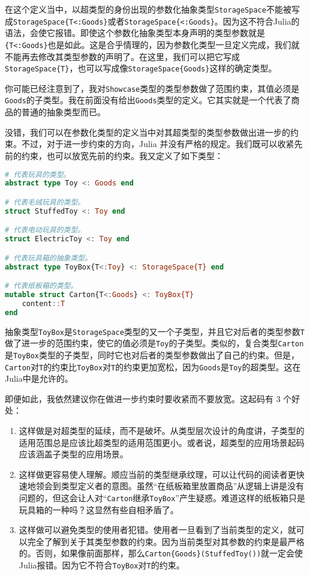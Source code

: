 在这个定义当中，以超类型的身份出现的参数化抽象类型\verb`StorageSpace`不能被写成\verb`StorageSpace{T<:Goods}`或者\verb`StorageSpace{<:Goods}`。因为这不符合Julia的语法，会使它报错。即使这个参数化抽象类型本身声明的类型参数就是\verb`{T<:Goods}`也是如此。这是合乎情理的，因为参数化类型一旦定义完成，我们就不能再去修改其类型参数的声明了。在这里，我们可以把它写成\verb`StorageSpace{T}`，也可以写成像\verb`StorageSpace{Goods}`这样的确定类型。

你可能已经注意到了，我对\verb`Showcase`类型的类型参数做了范围约束，其值必须是\verb`Goods`的子类型。我在前面没有给出\verb`Goods`类型的定义。它其实就是一个代表了商品的普通的抽象类型而已。

没错，我们可以在参数化类型的定义当中对其超类型的类型参数做出进一步的约束。不过，对于进一步约束的方向，Julia 并没有严格的规定。我们既可以收紧先前的约束，也可以放宽先前的约束。我又定义了如下类型：
\begin{lstlisting}[language=julia]
# 代表玩具的类型。
abstract type Toy <: Goods end

# 代表毛绒玩具的类型。
struct StuffedToy <: Toy end

# 代表电动玩具的类型。
struct ElectricToy <: Toy end

# 代表玩具箱的抽象类型。
abstract type ToyBox{T<:Toy} <: StorageSpace{T} end

# 代表纸板箱的类型。
mutable struct Carton{T<:Goods} <: ToyBox{T}
    content::T
end
\end{lstlisting}

抽象类型\verb`ToyBox`是\verb`StorageSpace`类型的又一个子类型，并且它对后者的类型参数\verb`T`做了进一步的范围约束，使它的值必须是\verb`Toy`的子类型。类似的，复合类型\verb`Carton`是\verb`ToyBox`类型的子类型，同时它也对后者的类型参数做出了自己的约束。但是，\verb`Carton`对\verb`T`的约束比\verb`ToyBox`对\verb`T`的约束更加宽松，因为\verb`Goods`是\verb`Toy`的超类型。这在Julia中是允许的。

即便如此，我依然建议你在做进一步约束时要收紧而不要放宽。这起码有 3 个好处：

\begin{enumerate}
\item 这样做是对超类型的延续，而不是破坏。从类型层次设计的角度讲，子类型的适用范围总是应该比超类型的适用范围更小。或者说，超类型的应用场景起码应该涵盖子类型的应用场景。
\item 这样做更容易使人理解。顺应当前的类型继承纹理，可以让代码的阅读者更快速地领会到类型定义者的意图。虽然“在纸板箱里放置商品”从逻辑上讲是没有问题的，但这会让人对“\verb`Carton`继承\verb`ToyBox`”产生疑惑。难道这样的纸板箱只是玩具箱的一种吗？这显然有些自相矛盾了。
\item 这样做可以避免类型的使用者犯错。使用者一旦看到了当前类型的定义，就可以完全了解到关于其类型参数的约束。因为当前类型对其参数的约束是最严格的。否则，如果像前面那样，那么\verb`Carton{Goods}(StuffedToy())`就一定会使Julia报错。因为它不符合\verb`ToyBox`对\verb`T`的约束。
\end{enumerate}

